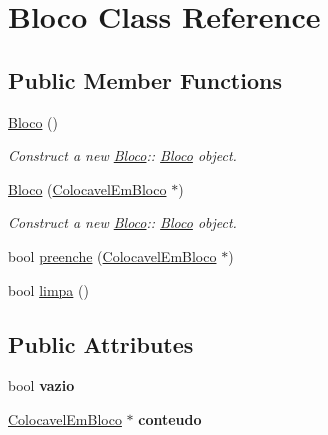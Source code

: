 \hypertarget{class_bloco}{}\section{Bloco Class Reference}
\label{class_bloco}
\subsection*{Public Member Functions}
\begin{DoxyCompactItemize}
\item 
\mbox{\label{class_bloco_a920ab5b6599552d1ba6ece51bb132626}} 
\mbox{\hyperlink{class_bloco_a920ab5b6599552d1ba6ece51bb132626}{Bloco}} ()
\begin{DoxyCompactList}\small\item\em Construct a new \mbox{\hyperlink{class_bloco}{Bloco}}\+:\+: \mbox{\hyperlink{class_bloco}{Bloco}} object. \end{DoxyCompactList}\item 
\mbox{\hyperlink{class_bloco_a1e474398aae75176e9d6bb14b8258541}{Bloco}} (\mbox{\hyperlink{class_colocavel_em_bloco}{Colocavel\+Em\+Bloco}} $\ast$)
\begin{DoxyCompactList}\small\item\em Construct a new \mbox{\hyperlink{class_bloco}{Bloco}}\+:\+: \mbox{\hyperlink{class_bloco}{Bloco}} object. \end{DoxyCompactList}\item 
bool \mbox{\hyperlink{class_bloco_ad5e26f6c5636ac72db653bd1329d5e2e}{preenche}} (\mbox{\hyperlink{class_colocavel_em_bloco}{Colocavel\+Em\+Bloco}} $\ast$)
\item 
bool \mbox{\hyperlink{class_bloco_a8260c149942e04f10f069696a6363451}{limpa}} ()
\end{DoxyCompactItemize}
\subsection*{Public Attributes}
\begin{DoxyCompactItemize}
\item 
\mbox{\label{class_bloco_aa453b9d7d8ad875974c09e2c8b21ba73}} 
bool {\bfseries vazio}
\item 
\mbox{\label{class_bloco_a638a917a143c421c404483437004a422}} 
\mbox{\hyperlink{class_colocavel_em_bloco}{Colocavel\+Em\+Bloco}} $\ast$ {\bfseries conteudo}
\end{DoxyCompactItemize}


